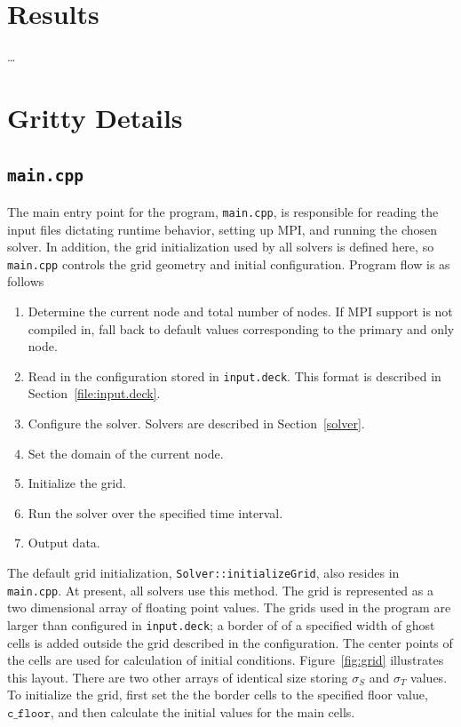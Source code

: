 \documentclass{article}
\newcommand{\main}{\texttt{main.cpp}\xspace}
\newcommand{\inputdeck}{\texttt{input.deck}\xspace}
\newcommand{\floor}{\ensuremath{\mathtt{c\_floor}}\xspace}
\begin{document}
\section{Results}
\dots

\clearpage
\appendix
\section{Gritty Details}
\subsection{\main}
\label{src:main.cpp}
The main entry point for the program, \main, is responsible for reading the input
files dictating runtime behavior, setting up MPI, and running the chosen solver.
In addition, the grid initialization used by all solvers is defined here, so \main
controls the grid geometry and initial configuration. Program flow is as follows
\begin{enumerate}
    \item Determine the current node and total number of nodes. If MPI support is not
    compiled in, fall back to default values corresponding to the primary and
    only node.
    \item Read in the configuration stored in \inputdeck. This format is
    described in Section~\ref{file:input.deck}.
    \item Configure the solver. Solvers are described in Section~\ref{solver}.
    \item Set the domain of the current node.
    \item Initialize the grid.
    \item Run the solver over the specified time interval.
    \item Output data.
\end{enumerate}

The default grid initialization, \texttt{Solver::initializeGrid}, also resides
in \main. At present, all solvers use this
method. The grid is represented as a two dimensional array of floating point values.
The grids used in the program are larger than configured in \inputdeck; a border of
of a specified width of ghost cells is added outside the grid described in the
configuration. The center points of the cells are used for calculation of
initial conditions. Figure~\ref{fig:grid} illustrates this layout.
There are two other arrays of identical size storing $\sigma_S$ and $\sigma_T$
values. To initialize the grid, first set the the border cells to the
specified floor value, \floor, and then calculate the initial values for the
main cells.
\end{document}

